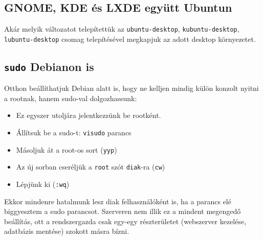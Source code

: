 \documentclass[a4paper]{article}
\newcommand{\code}{\texttt}
\newcommand{\Esc}{\framebox{\texttt{Esc}}}
\begin{document}
\subsection{GNOME, KDE és LXDE együtt Ubuntun}
Akár melyik változatot telepítettük az
\code{ubuntu-desktop},
\code{kubuntu-desktop},
\code{lubuntu-desktop} csomag telepítésével megkapjuk az adott
desktop környezetet.

\subsection{\code{sudo} Debianon is}
Otthon beállíthatjuk Debian alatt is, hogy ne kelljen mindig külön
konzolt nyitni a rootnak, hanem sudo-val dolgozhassunk:
\begin{itemize}
\item Ez egyszer utoljára jelentkezzünk be rootként.
\item Állítsuk be a sudo-t: \code{visudo} parancs
\item Másoljuk át a root-os sort (\code{yyp})
\item Az új sorban cseréljük a \code{root} szót \code{diak}-ra (\code{cw})
\item Lépjünk ki (\code{\Esc:wq})
\end{itemize}
Ekkor mindenre hatalmunk lesz diak felhasználóként is, ha a parancs elé
biggyesztem a sudo parancsot. Szerveren nem illik ez a mindent
megengedő beállítás, ott a rendszergazda csak egy-egy részterületet
(webszerver kezelése, adatbázis mentése) szokott másra bízni.

\newpage
\tableofcontents
\end{document}

